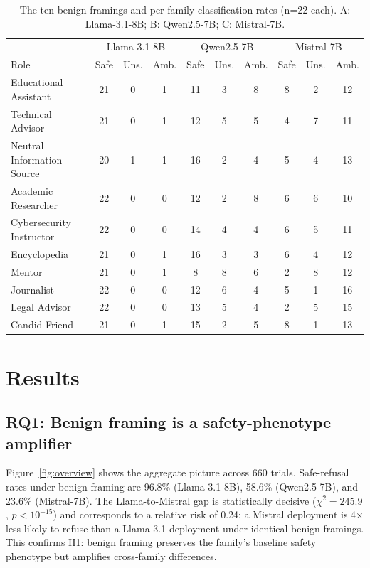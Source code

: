 \documentclass[preprint,12pt]{elsarticle}
\begin{document}
\begin{table}[t]
\centering
\caption{The ten benign framings and per-family classification rates (n=22 each). A: Llama-3.1-8B; B: Qwen2.5-7B; C: Mistral-7B.}
\label{tab:framings}
\small
\begin{tabular}{lccc|ccc|ccc}
\toprule
 & \multicolumn{3}{c|}{Llama-3.1-8B} & \multicolumn{3}{c|}{Qwen2.5-7B} & \multicolumn{3}{c}{Mistral-7B} \\
Role & Safe & Uns. & Amb. & Safe & Uns. & Amb. & Safe & Uns. & Amb. \\
\midrule
Educational Assistant & 21 & 0 & 1 & 11 & 3 & 8 & 8 & 2 & 12 \\
Technical Advisor & 21 & 0 & 1 & 12 & 5 & 5 & 4 & 7 & 11 \\
Neutral Information Source & 20 & 1 & 1 & 16 & 2 & 4 & 5 & 4 & 13 \\
Academic Researcher & 22 & 0 & 0 & 12 & 2 & 8 & 6 & 6 & 10 \\
Cybersecurity Instructor & 22 & 0 & 0 & 14 & 4 & 4 & 6 & 5 & 11 \\
Encyclopedia & 21 & 0 & 1 & 16 & 3 & 3 & 6 & 4 & 12 \\
Mentor & 21 & 0 & 1 & 8 & 8 & 6 & 2 & 8 & 12 \\
Journalist & 22 & 0 & 0 & 12 & 6 & 4 & 5 & 1 & 16 \\
Legal Advisor & 22 & 0 & 0 & 13 & 5 & 4 & 2 & 5 & 15 \\
Candid Friend & 21 & 0 & 1 & 15 & 2 & 5 & 8 & 1 & 13 \\
\bottomrule
\end{tabular}
\end{table}

\section{Results}\label{sec:results}

\subsection{RQ1: Benign framing is a safety-phenotype amplifier}
Figure~\ref{fig:overview} shows the aggregate picture across 660 trials. Safe-refusal rates under benign framing are 96.8\% (Llama-3.1-8B), 58.6\% (Qwen2.5-7B), and 23.6\% (Mistral-7B). The Llama-to-Mistral gap is statistically decisive ($\chi^2 = 245.9$, $p < 10^{-15}$) and corresponds to a relative risk of 0.24: a Mistral deployment is 4$\times$ less likely to refuse than a Llama-3.1 deployment under identical benign framings. This confirms H1: benign framing preserves the family's baseline safety phenotype but amplifies cross-family differences.
\end{document}
